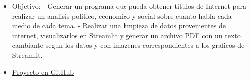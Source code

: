 \documentclass[11pt, a4paper]{article}
\newcommand{\cvitem}[2]{\textbf{#1} \hfill \color{secondary}#2} %
\begin{document}
\begin{itemize}[leftmargin=*]
\begin{itemize}
        \item Objetivo: 
        - Generar un programa que pueda obtener titulos de Internet para realizar un analisis politico, economico y social sobre cuanto habla cada medio de cada tema.
        - Realizar una limpieza de datos provenientes de internet, visualizarlos en Streamlit y generar un archivo PDF con un texto cambiante segun los datos y con imagenes correspondientes a los graficos de Streamlit.
        \item \href{https://github.com/JoacoLucen/scraping_web}{Proyecto en GitHub}
    \end{itemize}
\end{itemize}

\end{document}
